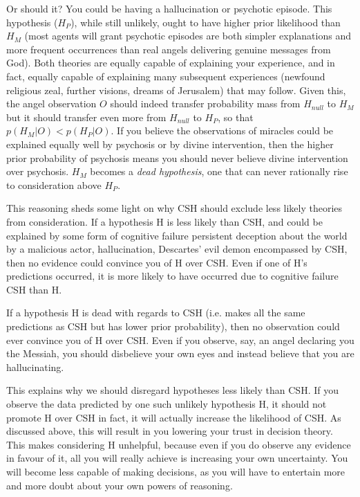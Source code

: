 \documentclass{article}
\begin{document}
Or should it? You could be having a hallucination or psychotic episode. This hypothesis (\(H_{P}\)), while still unlikely, ought to have higher prior likelihood than \(H_{M}\) (most agents will grant psychotic episodes are both simpler explanations and more frequent occurrences than real angels delivering genuine messages from God). Both theories are equally capable of explaining your experience, and in fact, equally capable of explaining many subsequent experiences (newfound religious zeal, further visions, dreams of Jerusalem) that may follow. Given this, the angel observation \(O\) should indeed transfer probability mass from \(H_{null}\) to \(H_{M}\) \textemdash{} but it should transfer even more from \(H_{null}\) to \(H_{P}\), so that \(p(H_{M}|O)<p(H_{P}|O)\). If you believe the observations of miracles could be explained equally well by psychosis or by divine intervention, then the higher prior probability of psychosis means you should never believe divine intervention over psychosis. \(H_{M}\) becomes a \textit{dead hypothesis}, one that can never rationally rise to consideration above \(H_{P}\).

This reasoning sheds some light on why CSH should exclude less likely theories from consideration. If a hypothesis H is less likely than CSH, and could be explained by some form of cognitive failure \textemdash{} persistent deception about the world by a malicious actor, hallucination, Descartes' evil demon \textemdash{} encompassed by CSH, then no evidence could convince you of H over CSH. Even if one of H's predictions occurred, it is more likely to have occurred due to cognitive failure CSH than H. 

If a hypothesis H is dead with regards to CSH (i.e. makes all the same predictions as CSH but has lower prior probability), then no observation could ever convince you of H over CSH. Even if you observe, say, an angel declaring you the Messiah, you should disbelieve your own eyes and instead believe that you are hallucinating.

This explains why we should disregard hypotheses less likely than CSH. If you observe the data predicted by one such unlikely hypothesis H, it should not promote H over CSH \textemdash{} in fact, it will actually increase the likelihood of CSH. As discussed above, this will result in you lowering your trust in decision theory. This makes considering H unhelpful, because even if you do observe any evidence in favour of it, all you will really achieve is increasing your own uncertainty. You will become less capable of making decisions, as you will have to entertain more and more doubt about your own powers of reasoning.
\end{document}
